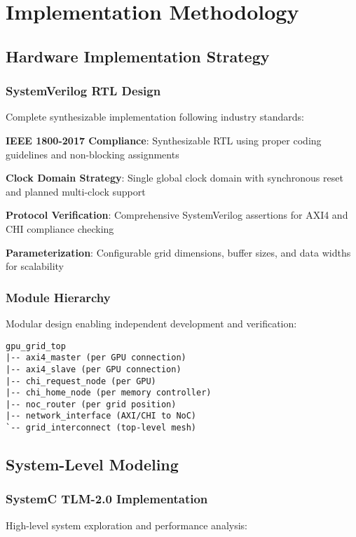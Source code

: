 \documentclass[11pt,a4paper]{article}
\begin{document}
\section{Implementation Methodology}

\subsection{Hardware Implementation Strategy}

\subsubsection{SystemVerilog RTL Design}
Complete synthesizable implementation following industry standards:

\begin{techlist}
    \item \textbf{IEEE 1800-2017 Compliance}: Synthesizable RTL using proper coding guidelines and non-blocking assignments
    \item \textbf{Clock Domain Strategy}: Single global clock domain with synchronous reset and planned multi-clock support
    \item \textbf{Protocol Verification}: Comprehensive SystemVerilog assertions for AXI4 and CHI compliance checking
    \item \textbf{Parameterization}: Configurable grid dimensions, buffer sizes, and data widths for scalability
\end{techlist}

\subsubsection{Module Hierarchy}
Modular design enabling independent development and verification:

\begin{verbatim}
gpu_grid_top
|-- axi4_master (per GPU connection)
|-- axi4_slave (per GPU connection)
|-- chi_request_node (per GPU)
|-- chi_home_node (per memory controller)
|-- noc_router (per grid position)
|-- network_interface (AXI/CHI to NoC)
`-- grid_interconnect (top-level mesh)
\end{verbatim}

\subsection{System-Level Modeling}

\subsubsection{SystemC TLM-2.0 Implementation}
High-level system exploration and performance analysis:
\end{document}
